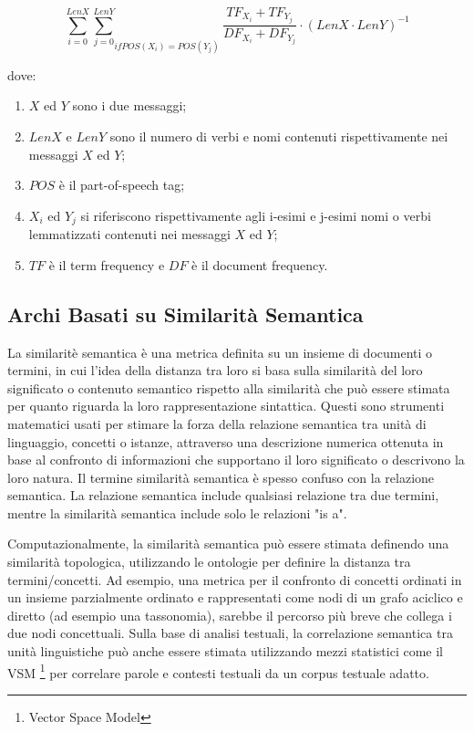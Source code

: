 \begin{equation}
\sum_{i=0}^{LenX} {\sum_{j=0}^{LenY}}_{if POS(X_{i}) = POS(Y_{j})} \frac{TF_{X_{i}} + TF_{Y_{j}}}{DF_{X_{i}} + DF_{Y_{j}}} \cdot (LenX \cdot LenY)^{-1}
\end{equation}

dove: 

\begin{enumerate}[label=(\roman*)]
  
\item \( X \) ed \( Y \) sono i due messaggi;
\item \( LenX \) e \( LenY \) sono il numero di verbi e nomi contenuti rispettivamente nei messaggi \( X \) ed \( Y \);
\item \( POS \) {\`e} il part-of-speech tag;
\item \( X_{i} \) ed \( Y_{j} \) si riferiscono rispettivamente agli i-esimi e j-esimi nomi o verbi lemmatizzati contenuti nei messaggi \( X \) ed \( Y \);
\item \( TF \) {\`e} il term frequency e \( DF \) {\`e} il document frequency.

\end{enumerate}

\subsection{Archi Basati su Similarit{\`a} Semantica}
La similarit{\`e} semantica {\`e} una metrica definita su un insieme di documenti o termini, in cui l'idea della distanza tra loro si basa sulla similarit{\`a} del loro significato o contenuto semantico rispetto alla similarit{\`a} che pu{\`o} essere stimata per quanto riguarda la loro rappresentazione sintattica. Questi sono strumenti matematici usati per stimare la forza della relazione semantica tra unit{\`a} di linguaggio, concetti o istanze, attraverso una descrizione numerica ottenuta in base al confronto di informazioni che supportano il loro significato o descrivono la loro natura. Il termine similarit{\`a} semantica è spesso confuso con la relazione semantica. La relazione semantica include qualsiasi relazione tra due termini, mentre la similarit{\`a} semantica include solo le relazioni "is a".

Computazionalmente, la similarit{\`a} semantica può essere stimata definendo una similarit{\`a} topologica, utilizzando le ontologie per definire la distanza tra termini/concetti. Ad esempio, una metrica per il confronto di concetti ordinati in un insieme parzialmente ordinato e rappresentati come nodi di un grafo aciclico e diretto (ad esempio una tassonomia), sarebbe il percorso pi{\`u} breve che collega i due nodi concettuali. Sulla base di analisi testuali, la correlazione semantica tra unit{\`a} linguistiche pu{\`o} anche essere stimata utilizzando mezzi statistici come il VSM \footnote{Vector Space Model} per correlare parole e contesti testuali da un corpus testuale adatto.

